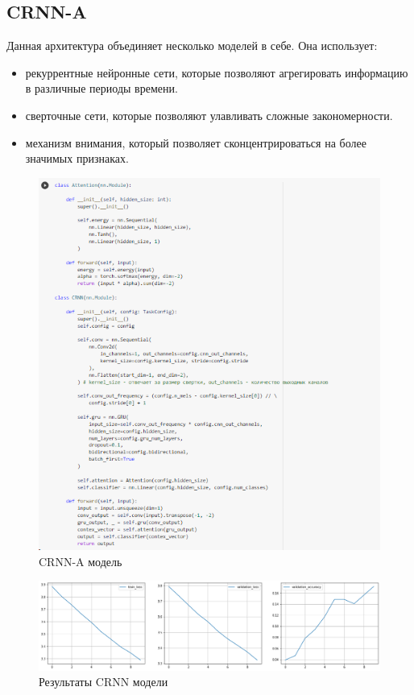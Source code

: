 \documentclass[a4paper,12pt]{article}
\begin{document}
	\subsection{CRNN-A}
	
	Данная архитектура объединяет несколько моделей в себе. Она использует:
	\begin{itemize}
		\item рекуррентные нейронные сети, которые позволяют агрегировать информацию в различные периоды времени.
		\item сверточные сети, которые позволяют улавливать сложные закономерности.
		\item механизм внимания, который позволяет сконцентрироваться на более значимых признаках.
	\end{itemize}
	
	\begin{figure}[H]
		\centering
		\includegraphics[width=1\linewidth]{Image/CRNN}
		\caption{CRNN-A модель}
		\label{fig:crnn}
	\end{figure}
	
 	\begin{figure}[H]
 		\centering
 		\includegraphics[width=1\linewidth]{Image/CRNN_train.png}
 		\caption{Результаты CRNN модели}
 		\label{fig:crnn}
 	\end{figure}
 
\end{document}

